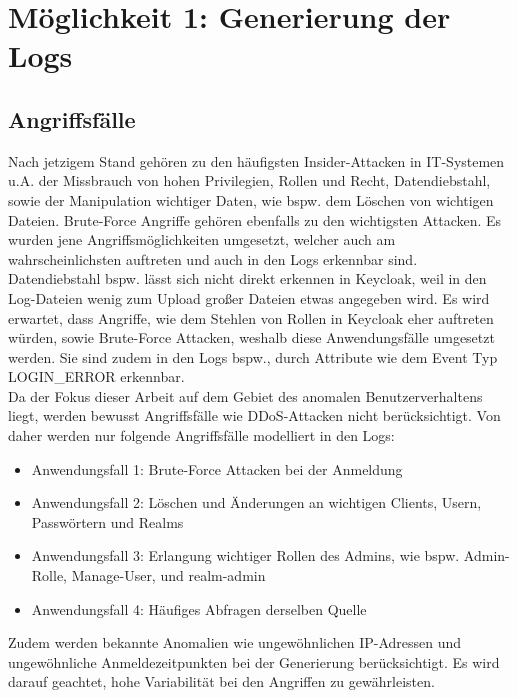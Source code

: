 \documentclass[a4paper,12pt]{article}
\begin{document}
	
	\section{Möglichkeit 1: Generierung der Logs}
	\subsection{Angriffsfälle}
	Nach jetzigem Stand gehören zu den häufigsten Insider-Attacken in IT-Systemen u.A. der Missbrauch von hohen Privilegien, Rollen und Recht, Datendiebstahl, sowie der Manipulation wichtiger Daten, wie bspw. dem Löschen von wichtigen Dateien. Brute-Force Angriffe gehören ebenfalls zu den wichtigsten Attacken. Es wurden jene Angriffsmöglichkeiten umgesetzt, welcher auch am wahrscheinlichsten auftreten und auch in den Logs erkennbar sind. Datendiebstahl bspw. lässt sich nicht direkt erkennen in Keycloak, weil in den Log-Dateien wenig zum Upload großer Dateien etwas angegeben wird. Es wird erwartet, dass Angriffe, wie dem Stehlen von Rollen in Keycloak eher auftreten würden, sowie Brute-Force Attacken, weshalb diese Anwendungsfälle umgesetzt werden. Sie sind zudem in den Logs bspw., durch Attribute wie dem Event Typ LOGIN\_ERROR erkennbar. 
	\\[0.5em]
	Da der Fokus dieser Arbeit auf dem Gebiet des anomalen Benutzerverhaltens liegt, werden bewusst Angriffsfälle wie DDoS-Attacken nicht berücksichtigt. Von daher werden nur folgende Angriffsfälle modelliert in den Logs:
	
	\begin{itemize}
		\item Anwendungsfall 1: Brute-Force Attacken bei der Anmeldung
		\item Anwendungsfall 2: Löschen und Änderungen an wichtigen Clients, Usern, Passwörtern und Realms
		\item Anwendungsfall 3: Erlangung wichtiger Rollen des Admins, wie bspw. Admin-Rolle, Manage-User, und realm-admin
		\item Anwendungsfall 4: Häufiges Abfragen derselben Quelle
	\end{itemize}
	
	Zudem werden bekannte Anomalien wie ungewöhnlichen IP-Adressen und ungewöhnliche Anmeldezeitpunkten bei der Generierung berücksichtigt. Es wird darauf geachtet, hohe Variabilität bei den Angriffen zu gewährleisten.
	
\end{document}
